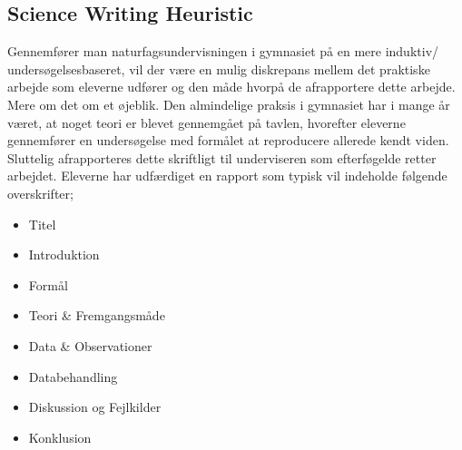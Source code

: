 \subsection*{Science Writing Heuristic}
Gennemfører man naturfagsundervisningen i gymnasiet på en mere induktiv/ undersøgelsesbaseret, vil der være en mulig diskrepans mellem det praktiske arbejde som eleverne udfører og den måde hvorpå de afrapportere dette arbejde. Mere om det om et øjeblik. Den almindelige praksis i gymnasiet har i mange år været, at noget teori er blevet gennemgået på tavlen, hvorefter eleverne gennemfører en undersøgelse med formålet at reproducere allerede kendt viden. Sluttelig afrapporteres dette skriftligt til underviseren som efterføgelde retter arbejdet. Eleverne har udfærdiget en rapport som typisk vil indeholde følgende overskrifter;
\begin{itemize}
	\item Titel\vspace{-15pt}
	\item Introduktion\vspace{-15pt}
	\item Formål\vspace{-15pt}
	\item Teori \& Fremgangsmåde\vspace{-15pt}
	\item Data \& Observationer\vspace{-15pt}
	\item Databehandling\vspace{-15pt}
	\item Diskussion og Fejlkilder\vspace{-15pt}
	\item Konklusion
\end{itemize}

